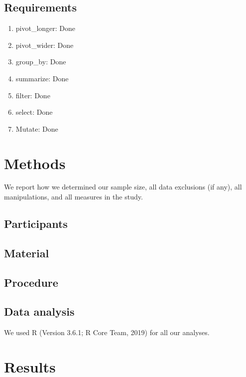 \documentclass[man]{apa6}
\providecommand{\tightlist}{%
  \setlength{\itemsep}{0pt}\setlength{\parskip}{0pt}}
\begin{document}
\hypertarget{requirements}{%
\subsection{Requirements}\label{requirements}}

\begin{enumerate}
\def\labelenumi{\arabic{enumi}.}
\tightlist
\item
  pivot\_longer: Done
\item
  pivot\_wider: Done
\item
  group\_by: Done
\item
  summarize: Done
\item
  filter: Done
\item
  select: Done
\item
  Mutate: Done
\end{enumerate}

\hypertarget{methods}{%
\section{Methods}\label{methods}}

We report how we determined our sample size, all data exclusions (if any), all manipulations, and all measures in the study.

\hypertarget{participants}{%
\subsection{Participants}\label{participants}}

\hypertarget{material}{%
\subsection{Material}\label{material}}

\hypertarget{procedure}{%
\subsection{Procedure}\label{procedure}}

\hypertarget{data-analysis}{%
\subsection{Data analysis}\label{data-analysis}}

We used R (Version 3.6.1; R Core Team, 2019) for all our analyses.

\hypertarget{results}{%
\section{Results}\label{results}}
\end{document}
